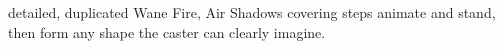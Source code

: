   {detailed, duplicated}%
  {Wane}%
  {Fire, Air}%
  {}%
  {Shadows covering  steps animate and stand, then form any shape the caster can clearly imagine.}%
  {}
